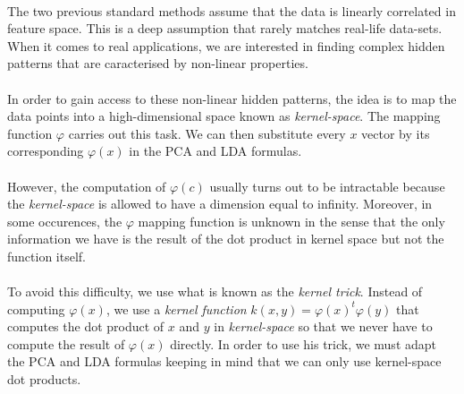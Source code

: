 \paragraph{}
The two previous standard methods assume that the data is linearly correlated in feature space. This
is a deep assumption that rarely matches real-life data-sets. When it comes to real applications, we
are interested in finding complex hidden patterns that are caracterised by non-linear properties.

\paragraph{}
In order to gain access to these non-linear hidden patterns, the idea is to map the data points into
a high-dimensional space known as \emph{kernel-space}. The mapping function $\varphi$ carries out
this task. We can then substitute every $x$ vector by its corresponding $\varphi(x)$ in the PCA and
LDA formulas.

\paragraph{}
However, the computation of $\varphi(c)$ usually turns out to be intractable because the
\emph{kernel-space} is allowed to have a dimension equal to infinity. Moreover, in some occurences,
the $\varphi$ mapping function is unknown in the sense that the only information we have is the
result of the dot product in kernel space but not the function itself.

\paragraph{}
To avoid this difficulty, we use what is known as the \emph{kernel trick}. Instead of computing
$\varphi(x)$, we use a \emph{kernel function} $k(x, y) = \varphi(x)^t\varphi(y)$ that computes
the dot product of $x$ and $y$ in \emph{kernel-space} so that we never have to compute the result of
$\varphi(x)$ directly. In order to use his trick, we must adapt the PCA and LDA formulas keeping in
mind that we can only use kernel-space dot products.
